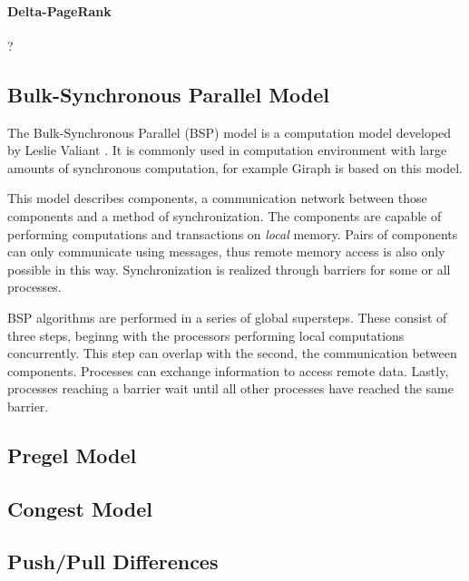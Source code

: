 \paragraph{Delta-PageRank}
?

\subsection{Bulk-Synchronous Parallel Model}
\label{sec:bsp}
The Bulk-Synchronous Parallel (BSP) model is a computation model developed by Leslie Valiant \cite{bsp}. It is commonly used in computation environment with large amounts of synchronous computation, for example Giraph is based on this model.

This model describes components, a communication network between those components and a method of synchronization.
The components are capable of performing computations and transactions on \emph{local} memory. Pairs of components can only communicate using messages, thus remote memory access is also only possible in this way.
Synchronization is realized through barriers for some or all processes.

BSP algorithms are performed in a series of global supersteps. These consist of three steps, beginng with the processors performing local computations concurrently.
This step can overlap with the second, the communication between components. Processes can exchange information to access remote data.
Lastly, processes reaching a barrier wait until all other processes have reached the same barrier.

\subsection{Pregel Model}




\subsection{Congest Model}



\subsection{Push/Pull Differences}
